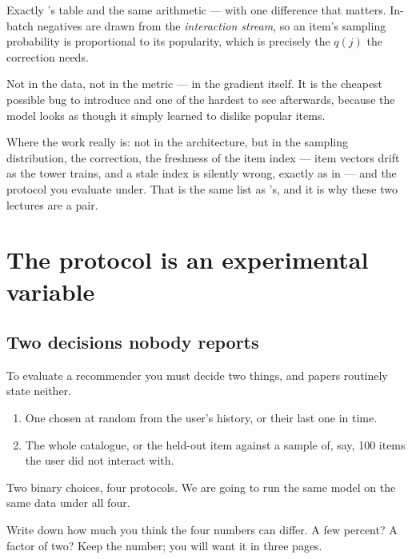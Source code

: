 \documentclass[11pt,a4paper]{article}
\begin{document}
Exactly 's table and the same arithmetic --- with one difference
that matters. In-batch negatives are drawn from the \emph{interaction stream},
so an item's sampling probability is proportional to its popularity, which is
precisely the $q(j)$ the correction needs.

\begin{failbox}[title={Failure condition --- skip the correction and popularity bias is in the gradient}]
Not in the data, not in the metric --- in the gradient itself. It is the
cheapest possible bug to introduce and one of the hardest to see afterwards,
because the model looks as though it simply learned to dislike popular items.
\end{failbox}

Where the work really is: not in the architecture, but in the sampling
distribution, the correction, the freshness of the item index --- item vectors
drift as the tower trains, and a stale index is silently wrong, exactly as in
 --- and the protocol you evaluate under. That is the same list as
's, and it is why these two lectures are a pair.

\section{The protocol is an experimental variable}

\subsection{Two decisions nobody reports}

To evaluate a recommender you must decide two things, and papers routinely
state neither.

\begin{enumerate}[leftmargin=*]
  \item {} One chosen at random from the
        user's history, or their last one in time.
  \item {} The whole catalogue, or the held-out
        item against a sample of, say, 100 items the user did not interact
        with.
\end{enumerate}

Two binary choices, four protocols. We are going to run the same model on the
same data under all four.

\begin{trybox}[title={Commit now}]
Write down how much you think the four numbers can differ. A few percent? A
factor of two? Keep the number; you will want it in three pages.
\end{trybox}
\end{document}
